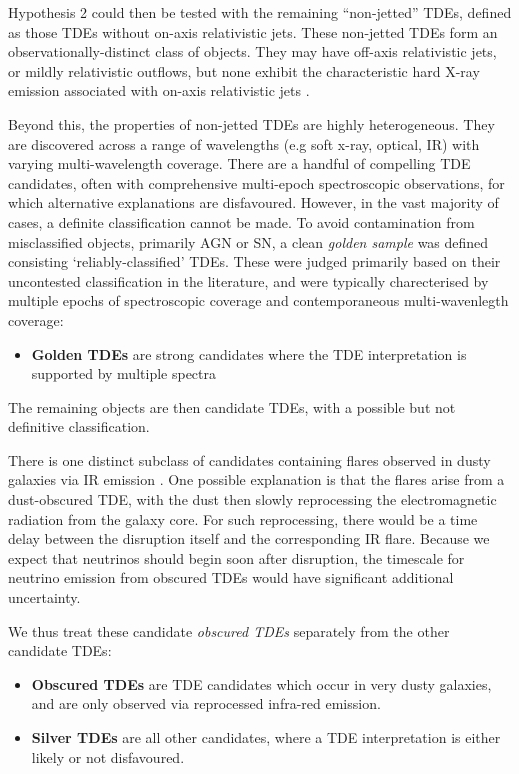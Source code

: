 Hypothesis 2 could then be tested with the remaining ``non-jetted'' TDEs, defined as those TDEs without on-axis relativistic jets. These non-jetted TDEs form an observationally-distinct class of objects. They may have off-axis relativistic jets, or mildly relativistic outflows, but none exhibit the characteristic hard X-ray emission associated with on-axis relativistic jets .

Beyond this, the properties of non-jetted TDEs are highly heterogeneous. They are discovered across a range of wavelengths (e.g soft x-ray, optical, IR) with varying multi-wavelength coverage. There are a handful of compelling TDE candidates, often with comprehensive multi-epoch spectroscopic observations, for which alternative explanations are disfavoured. However, in the vast majority of cases, a definite classification cannot be made. To avoid contamination from misclassified objects, primarily AGN or SN, a clean \emph{golden sample} was defined consisting `reliably-classified' TDEs. These were judged primarily based on their uncontested classification in the literature, and were typically charecterised by multiple epochs of spectroscopic coverage and contemporaneous multi-wavenlegth coverage:

\begin{itemize}
	\item \textbf{Golden TDEs} are strong candidates where the TDE interpretation is supported by multiple spectra
\end{itemize}

The remaining objects are then candidate TDEs, with a possible but not definitive classification. 

There is one distinct subclass of candidates containing flares observed in dusty galaxies via IR emission . One possible explanation is that the flares arise from a dust-obscured TDE, with the dust then slowly reprocessing the electromagnetic radiation from the galaxy core.  For such reprocessing, there would be a time delay between the disruption itself and the corresponding IR flare. Because we expect that neutrinos should begin soon after disruption, the timescale for neutrino emission from obscured TDEs would have significant additional uncertainty. 

We thus treat these candidate \emph{obscured TDEs} separately from the other candidate TDEs:

\begin{itemize}
		\item \textbf{Obscured TDEs} are TDE candidates which occur in very dusty galaxies, and are only observed via reprocessed infra-red emission. 
	\item \textbf{Silver TDEs} are all other candidates, where a TDE interpretation is either likely or not disfavoured.
\end{itemize}

